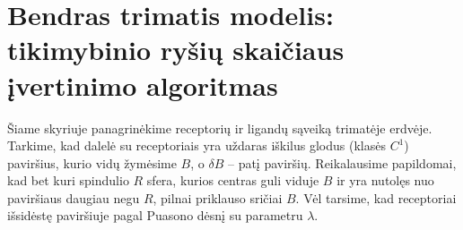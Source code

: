 \documentclass[10pt]{article}
\begin{document}


  


\section{Bendras trimatis modelis: tikimybinio ryšių skaičiaus įvertinimo algoritmas}

Šiame skyriuje panagrinėkime receptorių ir ligandų sąveiką trimatėje erdvėje. Tarkime, kad dalelė su receptoriais yra uždaras iškilus  glodus (klasės $ C^1 $) paviršius, kurio vidų žymėsime $ B $, o $ \delta B  $ -- patį paviršių. Reikalausime papildomai, kad bet kuri  spindulio $R$ sfera, kurios centras guli viduje $ B $ ir yra nutolęs nuo  paviršiaus daugiau negu $ R $, pilnai priklauso sričiai $ B $.  Vėl tarsime, kad receptoriai išsidėstę paviršiuje  pagal Puasono dėsnį su parametru $ \lambda $.
\end{document}
